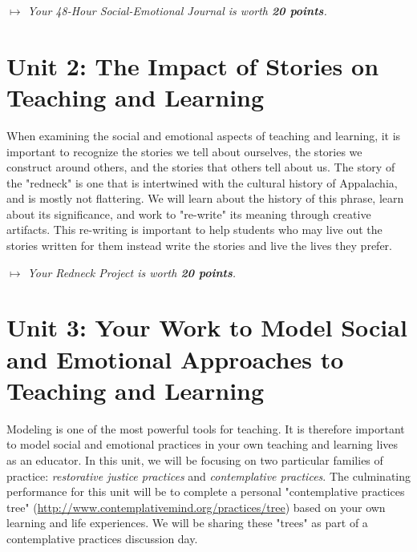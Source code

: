 \documentclass[two-side]{tufte-handout}
\begin{document}
\medskip\noindent\textit{$\mapsto$ Your 48-Hour Social-Emotional Journal is worth \textbf{20 points}.}

\section{Unit 2: The Impact of Stories on Teaching and Learning}

When examining the social and emotional aspects of teaching and learning, it is important to recognize the stories we tell about ourselves, the stories we construct around others, and the stories that others tell about us. The story of the "redneck" is one that is intertwined with the cultural history of Appalachia, and is mostly not flattering. We will learn about the history of this phrase, learn about its significance, and work to "re-write" its meaning through creative artifacts. This re-writing is important to help students who may live out the stories written for them instead write the stories and live the lives they prefer.

\medskip\noindent\textit{$\mapsto$ Your Redneck Project is worth \textbf{20 points}.}

\section{Unit 3: Your Work to Model Social and Emotional Approaches to Teaching and Learning}

Modeling is one of the most powerful tools for teaching. It is therefore important to model social and emotional practices in your own teaching and learning lives as an educator. In this unit, we will be focusing on two particular families of practice: \textit{restorative justice practices} and \textit{contemplative practices}. The culminating performance for this unit will be to complete a personal "contemplative practices tree" (\url{http://www.contemplativemind.org/practices/tree}) based on your own learning and life experiences. We will be sharing  these "trees" as part of a contemplative practices discussion day.
\end{document}
